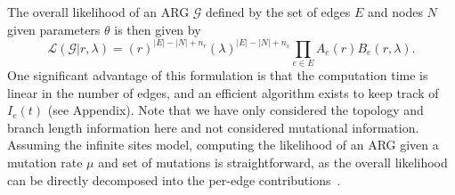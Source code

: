\documentclass{article}
\newcommand{\comment}[1]{{\it \color{orange} (#1)}}
\begin{document}
The overall likelihood of an ARG $\mathcal{G}$ defined by the set of edges $E$ and nodes $N$
given parameters $\theta$ is then given by
\begin{equation}\label{eq:full-lik}
    \mathcal{L}(\mathcal{G}|r, \lambda)
    =
    (r)^{|E|-|N|+n_r} (\lambda)^{|E|-|N|+n_s} \prod_{e \in E} A_e(r) B_e(r, \lambda) .
\end{equation}
One significant advantage of this formulation is that the computation time
is linear in the number of edges, and an efficient algorithm exists
to keep track of $I_e(t)$ (see Appendix).
Note that we have only considered the topology and branch length information here
and not considered mutational information.
Assuming the infinite sites model, computing the likelihood of
an ARG given a mutation rate $\mu$ and set of mutations is straightforward,
as the overall likelihood can be directly decomposed into the per-edge
contributions~\citep{baumdicker_efficient_2021,mahmoudi_bayesian_2022}.
\end{document}
